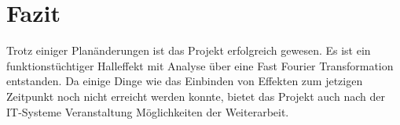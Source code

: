 \documentclass[12pt]{article}
\begin{document}
  
\section{Fazit}
Trotz einiger Planänderungen ist das Projekt erfolgreich gewesen. Es ist ein funktionstüchtiger Halleffekt mit Analyse über eine Fast Fourier Transformation entstanden.
Da einige Dinge wie das Einbinden von Effekten zum jetzigen Zeitpunkt noch nicht erreicht werden konnte, bietet das Projekt auch nach der IT-Systeme 
Veranstaltung Möglichkeiten der Weiterarbeit.  
\end{document}
